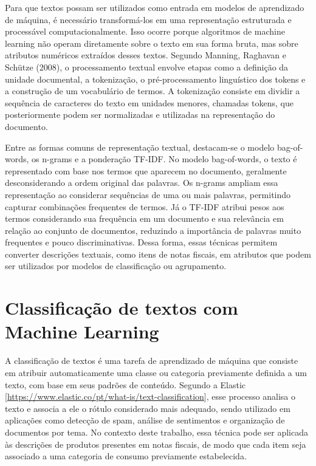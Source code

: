\documentclass[twoside,english,brazilian]{UNISINOSmonografia}
\begin{document}
Para que textos possam ser utilizados como entrada em modelos de aprendizado de máquina, é necessário transformá-los em uma representação estruturada e processável computacionalmente. Isso ocorre porque algoritmos de machine learning não operam diretamente sobre o texto em sua forma bruta, mas sobre atributos numéricos extraídos desses textos. Segundo Manning, Raghavan e Schütze (2008), o processamento textual envolve etapas como a definição da unidade documental, a tokenização, o pré-processamento linguístico dos tokens e a construção de um vocabulário de termos. A tokenização consiste em dividir a sequência de caracteres do texto em unidades menores, chamadas tokens, que posteriormente podem ser normalizadas e utilizadas na representação do documento.


Entre as formas comuns de representação textual, destacam-se o modelo bag-of-words, os n-grams e a ponderação TF-IDF. No modelo bag-of-words, o texto é representado com base nos termos que aparecem no documento, geralmente desconsiderando a ordem original das palavras. Os n-grams ampliam essa representação ao considerar sequências de uma ou mais palavras, permitindo capturar combinações frequentes de termos. Já o TF-IDF atribui pesos aos termos considerando sua frequência em um documento e sua relevância em relação ao conjunto de documentos, reduzindo a importância de palavras muito frequentes e pouco discriminativas. Dessa forma, essas técnicas permitem converter descrições textuais, como itens de notas fiscais, em atributos que podem ser utilizados por modelos de classificação ou agrupamento.


\section{Classificação de textos com Machine Learning}

A classificação de textos é uma tarefa de aprendizado de máquina que consiste em atribuir automaticamente uma classe ou categoria previamente definida a um texto, com base em seus padrões de conteúdo. Segundo a Elastic [\url{https://www.elastic.co/pt/what-is/text-classification}], esse processo analisa o texto e associa a ele o rótulo considerado mais adequado, sendo utilizado em aplicações como detecção de spam, análise de sentimentos e organização de documentos por tema. No contexto deste trabalho, essa técnica pode ser aplicada às descrições de produtos presentes em notas fiscais, de modo que cada item seja associado a uma categoria de consumo previamente estabelecida.
\end{document}
